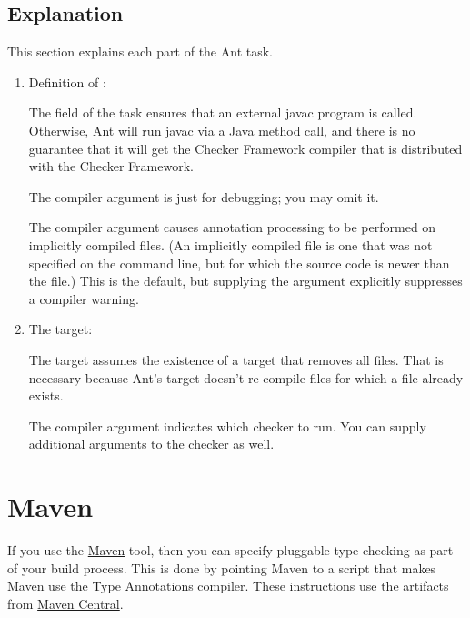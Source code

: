 \subsection{Explanation\label{ant-task-explanation}}

This section explains each part of the Ant task.

\begin{enumerate}
\item Definition of :

The  field of the  task
ensures that an external javac program is called.  Otherwise, Ant will run
javac via a Java method call, and there is no guarantee that it will get
the Checker Framework compiler that is distributed with the Checker Framework.

The  compiler argument is just for debugging; you may omit
it.

The  compiler argument causes annotation processing
to be performed on implicitly compiled files.  (An implicitly compiled file
is one that was not specified on the command line, but for which the source
code is newer than the  file.)  This is the default, but
supplying the argument explicitly suppresses a compiler warning.


\item The  target:

The target assumes the existence of a  target that removes all
 files.  That is necessary because Ant's  target
doesn't re-compile  files for which a  file
already exists.

The  compiler argument indicates which checker to
run.  You can supply additional arguments to the checker as well.

\end{enumerate}


\section{Maven\label{maven}}

If you use the \href{http://maven.apache.org/}{Maven} tool,
then you can specify pluggable type-checking as part of your build
process. This is done by pointing Maven to a script that
makes Maven use the Type Annotations compiler.
These instructions use the artifacts from
\href{http://search.maven.org/#search\%7Cga\%7C1\%7Corg.checkerframework}{Maven Central}.

